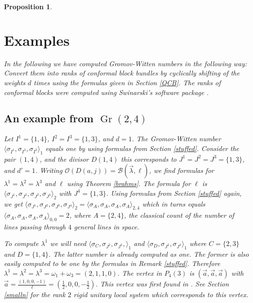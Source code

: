\documentclass[11pt]{amsart}
\newcommand\op{\operatorname}
\newtheorem{proposition}[theorem]{Proposition}
\numberwithin{theorem}{subsection}
\begin{document}
{\begin{proposition}
\section{Examples}\label{somemore}
In the following we have computed Gromov-Witten numbers in the following way: Convert them into ranks of conformal block bundles by cyclically shifting of the weights $d$ times using the formulas given in Section \ref{QCB}. The ranks of conformal blocks were computed using Swinarski's software package \cite{Swin}.

\subsection{An example from $\op{Gr}(2,4)$}\label{oldie}
Let $I^1=\{1,4\}$,  $I^2=I^3=\{1,3\}$, and $d=1$. The Gromov-Witten number $\langle \sigma_{I^1},\sigma_{I^2},\sigma_{I^3}\rangle_1$ equals one by using formulas from Section \ref{stuffed}. Consider the pair $(1,4)$, and the divisor $D(1,4)$ this corresponds to $J^1=J^2=J^3=\{1,3\}$, and $d'=1$. Writing $\mathcal{O}(D(a,j))=\mathcal{B}(\vec{\lambda},\ell)$, we find formulas for $\lambda^1=\lambda^2=\lambda^3$ and $\ell$ using Theorem \ref{brahms}. The formula for $\ell$ is  $\langle \sigma_{J^1},\sigma_{J^2},\sigma_{J^3},\sigma_{J^4}\rangle_2$ with $J^4=\{1,3\}$. Using formulas from Section \ref{stuffed} again, we get
$\langle \sigma_{J^1},\sigma_{J^2},\sigma_{J^3},\sigma_{J^4}\rangle_2=\langle \sigma_{A},\sigma_{A},\sigma_{A},\sigma_{A}\rangle_{2,4}$ which in turns equals
$\langle \sigma_{A},\sigma_{A},\sigma_{A},\sigma_{A}\rangle_{0,0}=2$, where $A=\{2,4\}$, the classical count of the number of lines passing through $4$ general lines in space.

To compute $\lambda^1$ we will need $\langle \sigma_{C},\sigma_{J^2},\sigma_{J^3},\rangle_1$ and  $\langle \sigma_{D},\sigma_{J^2},\sigma_{J^3}\rangle_1$ where $C=\{2,3\}$ and  $D=\{1,4\}$. The latter number is already computed as one. The former is also easily computed to be one by the formulas in Remark \ref{stuffed}.
Therefore $\lambda^1=\lambda^2=\lambda^3= \omega_1+\omega_3=(2,1,1,0)$. The vertex in $P_4(3)$ is $(\vec{a},\vec{a},\vec{a})$ with
$\vec{a} =\frac{(1,0,0,-1)}{\ell}=(\frac{1}{2},0,0,-\frac{1}{2})$. This vertex was first found in \cite[Section 7]{BLocal}. See Section \ref{smalln} for the rank $2$ rigid unitary local system which corresponds to this vertex.




\end{proposition}}
\end{document}

